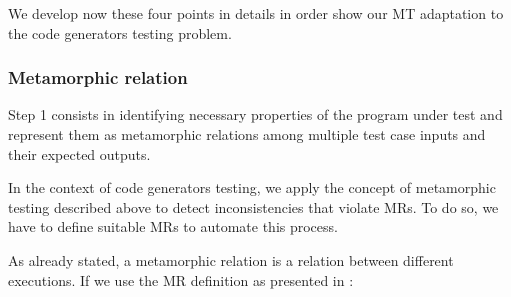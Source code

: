 We develop now these four points in details in order show our MT adaptation to the code generators testing problem. 
\subsubsection[(Step 1)]{Metamorphic relation }

Step 1 consists in identifying necessary properties of the program under test and represent them as metamorphic relations among multiple test case inputs and their expected outputs.

In the context of code generators testing, we apply the concept of metamorphic testing described above to detect inconsistencies that violate MRs.
To do so, we have to define suitable MRs to automate this process.

As already stated, a metamorphic relation is a relation between different executions.
If we use the MR definition as presented in \cite{tao2010automatic,chan2006integration}:

